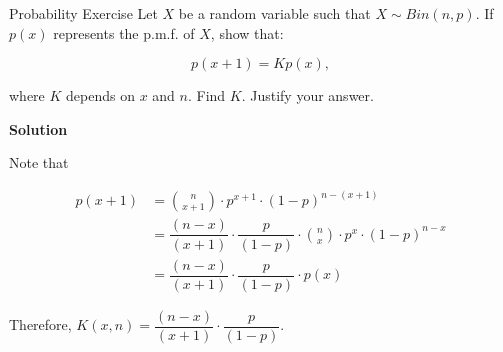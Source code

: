 \documentclass[12pt, a4paper]{article}
\begin{document}
\thispagestyle{fancy}

\begin{exercisebox}{Probability Exercise}
Let $X$ be a random variable such that $X \sim Bin(n, p)$. If $p(x)$ represents the p.m.f. of $X$, show that:

$$
p(x + 1) = K p(x) ,
$$

where $K$ depends on $x$ and $n$. Find $K$. Justify your answer.
\end{exercisebox}

\textbf{Solution}

Note that

\[
\begin{aligned}
    p(x+1) &=\binom{n}{x+1} \cdot p^{x+1} \cdot (1 - p)^{n - (x+1)}\\
    &= \dfrac{(n-x)}{(x+1)} \cdot \dfrac{p}{(1-p)} \cdot \binom{n}{x}\cdot p^{x}\cdot (1 - p)^{n - x}\\
    &= \dfrac{(n-x)}{(x+1)} \cdot \dfrac{p}{(1-p)} \cdot p(x)
\end{aligned}
\]

Therefore, $K(x,n) = \dfrac{(n-x)}{(x+1)} \cdot \dfrac{p}{(1-p)}$.
\end{document}
